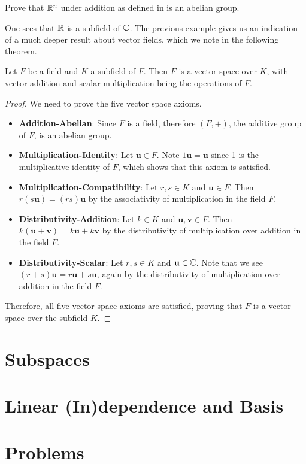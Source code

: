 \begin{exercise}\label{exercise-R^n-is-abelian-group}
    Prove that $\mathbb{R}^n$ under addition as defined in  is an abelian group.
\end{exercise}

One sees that $\mathbb{R}$ is a subfield of $\mathbb{C}$. The previous example gives us an indication of a much deeper result about vector fields, which we note in the following theorem.

\begin{theorem}
    Let $F$ be a field and $K$ a subfield of $F$. Then $F$ is a vector space over $K$, with vector addition and scalar multiplication being the operations of $F$.
\end{theorem}
\begin{proof}
    We need to prove the five vector space axioms.
    \begin{itemize}
        \item \textbf{Addition-Abelian}: Since $F$ is a field, therefore $(F, +)$, the additive group of $F$, is an abelian group.
        
        \item \textbf{Multiplication-Identity}: Let $\textbf{u} \in F$. Note $1\textbf{u} = \textbf{u}$ since 1 is the multiplicative identity of $F$, which shows that this axiom is satisfied.

        \item \textbf{Multiplication-Compatibility}: Let $r, s \in K$ and $\textbf{u} \in F$. Then $r(s\textbf{u}) = (rs)\textbf{u}$ by the associativity of multiplication in the field $F$.
        
        \item \textbf{Distributivity-Addition}: Let $k \in K$ and $\textbf{u}, \textbf{v} \in F$. Then $k(\textbf{u} + \textbf{v}) = k\textbf{u} + k\textbf{v}$ by the distributivity of multiplication over addition in the field $F$.
        
        \item \textbf{Distributivity-Scalar}: Let $r, s \in K$ and $\textbf{u} \in \mathbb{C}$. Note that we see $(r+s)\textbf{u} = r\textbf{u} + s\textbf{u}$, again by the distributivity of multiplication over addition in the field $F$.
    \end{itemize}

    Therefore, all five vector space axioms are satisfied, proving that $F$ is a vector space over the subfield $K$.
\end{proof}

\section{Subspaces}

\section{Linear (In)dependence and Basis}

\newpage

\section{Problems}
